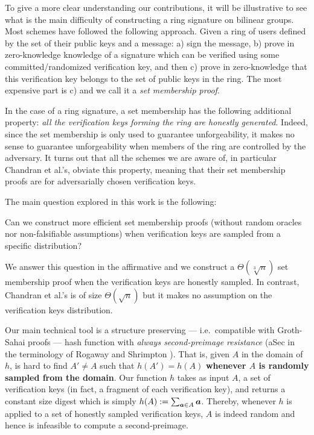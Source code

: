 
To give a more clear understanding our contributions, it will be illustrative to see what is the main difficulty of constructing a ring signature on bilinear groups. Most schemes have followed the following approach. Given a ring of users defined by the set of their public keys and a message: a) sign the message, b) prove in zero-knowledge knowledge of a signature which can be verified using some committed/randomized verification key, and then c) prove in zero-knowledge that this verification key belongs to the set of public keys in the ring.  The most expensive part is c) and we call it a \emph{set membership proof}.

In the case of a ring signature, a set membership has the following additional property: \emph{all the verification keys forming the ring are honestly generated}. 
Indeed, since the set membership is only used to guarantee unforgeability, it makes no sense to guarantee unforgeability when members of the ring are controlled by the adversary.
It turns out that all the schemes we are aware of, in particular Chandran et al.'s, obviate this property, meaning that their set membership proofs are for adversarially chosen verification keys.

The main question explored in this work is the following:
\begin{displayquote}
Can we construct more efficient set membership proofs (without random oracles nor non-falsifiable assumptions) when verification keys are sampled from a specific distribution?
\end{displayquote}
We answer this question in the affirmative and we construct a $\Theta(\sqrt[3]{n})$ set membership proof when the verification keys are honestly sampled. In contrast, Chandran et al.'s is of size $\Theta(\sqrt{n})$ but it makes no assumption on the verification keys distribution.

Our main technical tool is a structure preserving --- i.e.~compatible with Groth-Sahai proofs --- hash function with \emph{always second-preimage resistance} (aSec in the terminology of Rogaway and Shrimpton \cite{FSE:RogShr04}). That is, given $A$ in the domain of $h$, is hard to find $A'\neq A$ such that $h(A')=h(A)$ {\bf whenever $A$ is randomly sampled from the domain}.
Our function $h$ takes as input $A$, a set of verification keys (in fact, a fragment of each verification key), and returns a constant size digest which is simply $h(A):= \sum_{{\boldsymbol{a}} \in A} {\boldsymbol{a}}$. Thereby, whenever $h$ is applied to a set of honestly sampled verification keys, $A$ is indeed random and hence is infeasible to compute a second-preimage.

